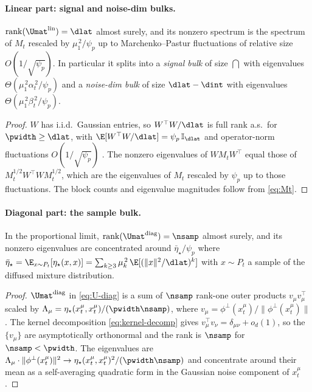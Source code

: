 \paragraph{Linear part: signal and noise-dim bulks.}
\begin{lemma}
\label{lem:Ulin}
$\mathrm{rank}(\Umat^{\mathrm{lin}}) = \dlat$ almost surely, and its
nonzero spectrum is the spectrum of $M_t$ rescaled by
$\mu_1^{\,2}/\psi_p$ up to Marchenko--Pastur fluctuations of
relative size $O(1/\sqrt{\psi_p})$. In particular it splits into
a \emph{signal bulk} of size $\dint$ with eigenvalues
$\Theta(\mu_1^{\,2}\alpha_t^{\,2}/\psi_p)$ and a \emph{noise-dim bulk}
of size $\dlat - \dint$ with eigenvalues
$\Theta(\mu_1^{\,2}\beta_t^{\,2}/\psi_p)$.
\end{lemma}
\begin{proof}
$W$ has i.i.d.\ Gaussian entries, so $W^\top W/\dlat$ is full rank a.s.\
for $\pwidth\ge\dlat$, with $\E[W^\top W/\dlat] = \psi_p\,\mathbb{I}_{\dlat}$
and operator-norm fluctuations $O(1/\sqrt{\psi_p})$
\citep{pennington2017nonlinear}. The nonzero eigenvalues of
$WM_tW^\top$ equal those of $M_t^{1/2}W^\top W M_t^{1/2}$, which are
the eigenvalues of $M_t$ rescaled by $\psi_p$ up to those fluctuations.
The block counts and eigenvalue magnitudes follow from \eqref{eq:Mt}.
\end{proof}

\paragraph{Diagonal part: the sample bulk.}
\begin{lemma}
\label{lem:Udiag}
In the proportional limit,
$\mathrm{rank}(\Umat^{\mathrm{diag}}) = \nsamp$ almost surely, and its
nonzero eigenvalues are concentrated around
$\bar\eta_\star/\psi_p$ where
$\bar\eta_\star = \E_{x\sim P_t}[\eta_\star(x,x)]
 = \sum_{k\ge 3}\mu_k^{\,2}\,\E[(\|x\|^2/\dlat)^k]$
with $x \sim P_t$ a sample of the diffused mixture distribution.
\end{lemma}
\begin{proof}
$\Umat^{\mathrm{diag}}$ in \eqref{eq:U-diag} is a sum of $\nsamp$
rank-one outer products $v_\mu v_\mu^\top$ scaled by
$\Lambda_\mu = \eta_\star(x_t^\mu,x_t^\mu)/(\pwidth\nsamp)$,
where $v_\mu = \phi^\perp(x_t^\mu)/\|\phi^\perp(x_t^\mu)\|$.
The kernel decomposition \eqref{eq:kernel-decomp} gives
$v_\mu^\top v_\nu = \delta_{\mu\nu} + o_d(1)$, so the $\{v_\mu\}$
are asymptotically orthonormal and the rank is $\nsamp$ for
$\nsamp < \pwidth$. The eigenvalues are
$\Lambda_\mu \cdot \|\phi^\perp(x_t^\mu)\|^2 \to
\eta_\star(x_t^\mu,x_t^\mu)^2/(\pwidth\nsamp)$ and concentrate
around their mean as a self-averaging quadratic form in the
Gaussian noise component of $x_t^\mu$.
\end{proof}

